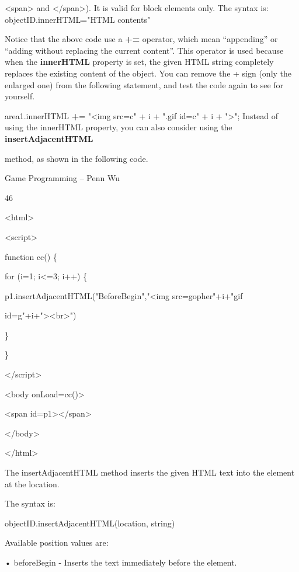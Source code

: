 \documentclass[
]{article}
\begin{document}
\textless span\textgreater{} and \textless/span\textgreater). It is
valid for block elements only. The syntax is: objectID.innerHTML="HTML
contents"

Notice that the above code use a \textbf{+=} operator, which mean
``appending'' or ``adding without replacing the current content''. This
operator is used because when the \textbf{innerHTML} property is set,
the given HTML string completely replaces the existing content of the
object. You can remove the + sign (only the enlarged one) from the
following statement, and test the code again to see for yourself.

area1.innerHTML \textbf{+}= "\textless img src=c" + i + ".gif id=c" + i
+ "\textgreater"; Instead of using the innerHTML property, you can also
consider using the \textbf{insertAdjacentHTML}

method, as shown in the following code.

Game Programming -- Penn Wu

46

\protect\hypertarget{index_split_004.htmlux5cux23p47}{}{}

\textless html\textgreater{}

\textless script\textgreater{}

function cc() \{

for (i=1; i\textless=3; i++) \{

p1.insertAdjacentHTML("BeforeBegin","\textless img
src=\textquotesingle gopher"+i+"gif\textquotesingle{}

id=g"+i+"\textgreater\textless br\textgreater")

\}

\}

\textless/script\textgreater{}

\textless body onLoad=cc()\textgreater{}

\textless span id=p1\textgreater\textless/span\textgreater{}

\textless/body\textgreater{}

\textless/html\textgreater{}

The insertAdjacentHTML method inserts the given HTML text into the
element at the location.

The syntax is:

objectID.insertAdjacentHTML(location, string)

Available position values are:

• beforeBegin - Inserts the text immediately before the element.
\end{document}
